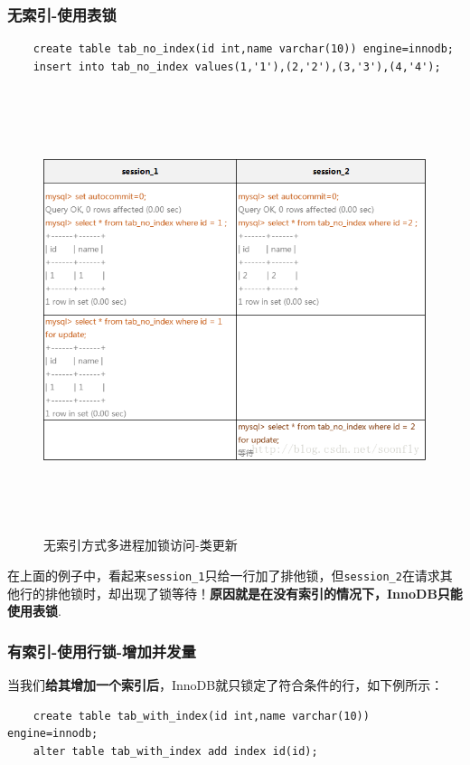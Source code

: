 \documentclass[UTF8,a4paper,12pt]{ctexbook}
\begin{document}
			\subsubsection{无索引-使用表锁}
				\begin{lstlisting}
	create table tab_no_index(id int,name varchar(10)) engine=innodb;
	insert into tab_no_index values(1,'1'),(2,'2'),(3,'3'),(4,'4');				
				\end{lstlisting}
				
				\begin{figure}[H]
					\centering
					\includegraphics[width=13cm, height=13cm]{lock-table}
					\caption{无索引方式多进程加锁访问-类更新}
				\end{figure}
				
				在上面的例子中，看起来\verb|session_1|只给一行加了排他锁，但\verb|session_2|在请求其他行的排他锁时，却出现了锁等待！\textbf{原因就是在没有索引的情况下，InnoDB只能使用表锁}.
				
			\subsubsection{有索引-使用行锁-增加并发量}
				当我们\textbf{给其增加一个索引后}，InnoDB就只锁定了符合条件的行，如下例所示： 
				\begin{lstlisting}
	create table tab_with_index(id int,name varchar(10)) engine=innodb;
	alter table tab_with_index add index id(id);			
				\end{lstlisting}
				
\end{document}
